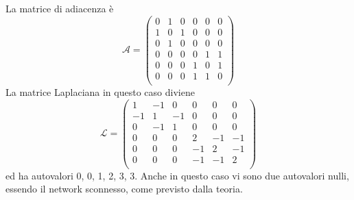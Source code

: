 \documentclass[../main.tex]{subfiles}
\begin{document}
La matrice di adiacenza \`e
\begin{equation}
    \mathcal{A}=\left(
    \begin{matrix}
        0 & 1 & 0 & 0 & 0 & 0\\
        1 & 0 & 1 & 0 & 0 & 0\\
        0 & 1 & 0 & 0 & 0 & 0\\
        0 & 0 & 0 & 0 & 1 & 1\\
        0 & 0 & 0 & 1 & 0 & 1\\
        0 & 0 & 0 & 1 & 1 & 0\\
    \end{matrix}\right)
\end{equation}
La matrice Laplaciana in questo caso diviene
\begin{equation}
    \mathcal{L}=\left(
    \begin{matrix}
        1 & -1 & 0 & 0 & 0 & 0\\
        -1 & 1 & -1 & 0 & 0 & 0\\
        0 & -1 & 1 & 0 & 0 & 0\\
        0 & 0 & 0 & 2 & -1 & -1\\
        0 & 0 & 0 & -1 & 2 & -1\\
        0 & 0 & 0 & -1 & -1 & 2\\
    \end{matrix}\right)
\end{equation}
ed ha autovalori 0, 0, 1, 2, 3, 3.
Anche in questo caso vi sono due autovalori nulli, essendo il network sconnesso, come previsto dalla teoria.
\end{document}
